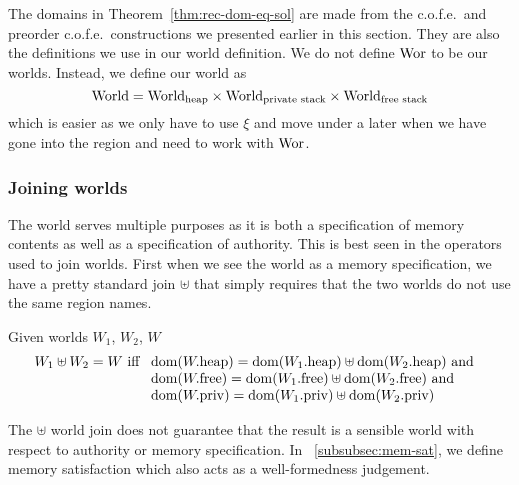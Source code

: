 \begin{jversion}
The domains in Theorem~\ref{thm:rec-dom-eq-sol} are made from the c.o.f.e.\ and preorder c.o.f.e.\ constructions we presented earlier in this section.
They are also the definitions we use in our world definition.
We do not define $\Wor$ to be our worlds.
Instead, we define our world as
\[
  \World = \Worldh \times \Worlds \times \Worldfs
\]
which is easier as we only have to use $\xi$ and move under a later when we have gone into the region and need to work with $\Wor$.

\subsubsection{Joining worlds}
The world serves multiple purposes as it is both a specification of memory contents as well as a specification of authority.
This is best seen in the operators used to join worlds.
First when we see the world as a memory specification, we have a pretty standard join $\uplus$ that simply requires that the two worlds do not use the same region names.
\begin{definition}
  Given worlds $W_1$, $W_2$, $W$
  \[
    W_1 \uplus W_2 = W
    \text{ iff }
    \begin{array}[t]{l}
      \dom(\pwheap) = \dom(\pwheap[W_1]) \uplus \dom(\pwheap[W_2]) \tand \\
      \dom(\pwfree) = \dom(\pwfree[W_1]) \uplus \dom(\pwfree[W_2]) \tand \\
      \dom(\pwpriv) = \dom(\pwpriv[W_1]) \uplus \dom(\pwpriv[W_2]) \\
    \end{array}
  \]
\end{definition}
The $\uplus$ world join does not guarantee that the result is a sensible world with respect to authority or memory specification.
In \sectionname~\ref{subsubsec:mem-sat}, we define memory satisfaction which also acts as a well-formedness judgement.


\end{jversion}
